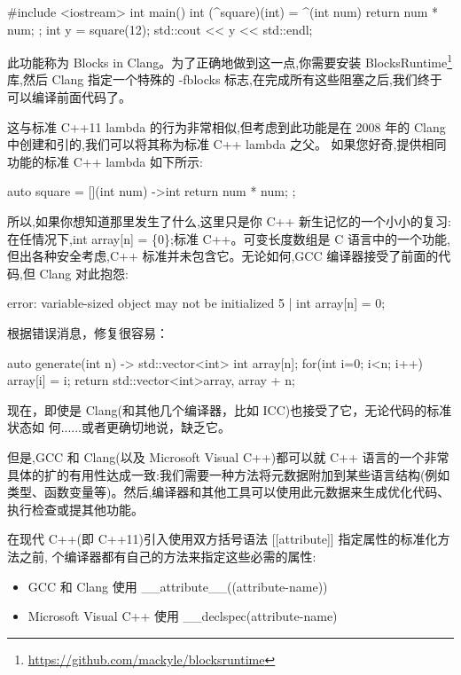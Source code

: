 \begin{cpp}
#include <iostream>
int main() {
  int (^square)(int) = ^(int num) { return num * num; };
  int y = square(12);
  std::cout << y << std::endl;
}
\end{cpp}

此功能称为 Blocks in Clang。为了正确地做到这一点,你需要安装 BlocksRuntime\footnote{\url{https://github.com/mackyle/blocksruntime}} 库,然后 Clang 指定一个特殊的 -fblocks 标志,在完成所有这些阻塞之后,我们终于可以编译前面代码了。

这与标准 C++11 lambda 的行为非常相似,但考虑到此功能是在 2008 年的 Clang 中创建和引的,我们可以将其称为标准 C++ lambda 之父。 如果您好奇,提供相同功能的标准 C++ lambda 如下所示:

\begin{cpp}
auto square = [](int num) ->int { return num * num; };
\end{cpp}

所以,如果你想知道那里发生了什么,这里只是你 C++ 新生记忆的一个小小的复习:在任情况下,int array[n] = \{0\};标准 C++。可变长度数组是 C 语言中的一个功能,但出各种安全考虑,C++ 标准并未包含它。无论如何,GCC 编译器接受了前面的代码,但 Clang 对此抱怨:

\begin{shell}
error: variable-sized object may not be initialized
   5 | int array[n] = {0};
\end{shell}

根据错误消息，修复很容易：

\begin{cpp}
auto generate(int n) -> std::vector<int>{
  int array[n];
  for(int i=0; i<n; i++) array[i] = i;
  return std::vector<int>{array, array + n};
}
\end{cpp}

现在，即使是 Clang(和其他几个编译器，比如 ICC)也接受了它，无论代码的标准状态如
何......或者更确切地说，缺乏它。


但是,GCC 和 Clang(以及 Microsoft Visual C++)都可以就 C++ 语言的一个非常具体的扩的有用性达成一致:我们需要一种方法将元数据附加到某些语言结构(例如类型、函数变量等)。然后,编译器和其他工具可以使用此元数据来生成优化代码、执行检查或提其他功能。

在现代 C++(即 C++11)引入使用双方括号语法 [[attribute]] 指定属性的标准化方法之前, 个编译器都有自己的方法来指定这些必需的属性:

\begin{itemize}
\item 
GCC 和 Clang 使用 \_\_attribute\_\_((attribute-name))

\item 
Microsoft Visual C++ 使用 \_\_declspec(attribute-name)
\end{itemize}

